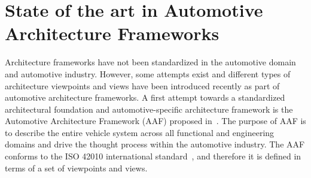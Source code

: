\section{State of the art in Automotive Architecture Frameworks}
Architecture frameworks have not been standardized in the automotive domain and automotive industry. 
However, some attempts exist and different types of architecture viewpoints and views have been introduced recently as part
of automotive architecture frameworks. 
A first attempt towards a standardized architectural foundation and automotive-specific
architecture framework is the Automotive
Architecture Framework (AAF) proposed in~\cite{Broy}. 
The purpose of AAF is to describe the entire vehicle system
across all functional and engineering domains and drive the thought process within the
automotive industry.
The AAF conforms to the ISO 42010 international standard~\cite{42010}, and therefore it is defined in terms of a set of viewpoints and views. 
%
%
%
%
%

